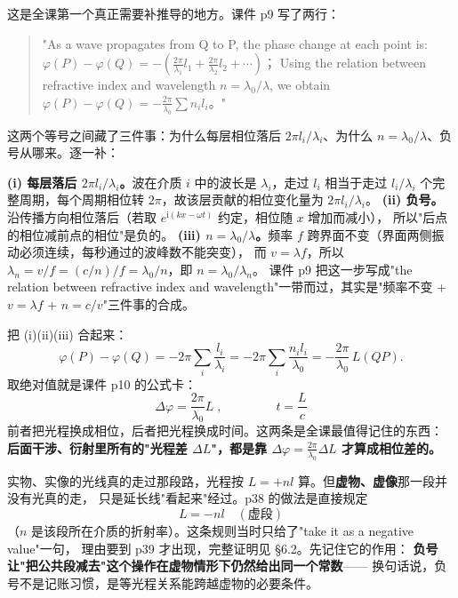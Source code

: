 \documentclass[11pt]{ctexart}
\begin{document}

这是全课第一个真正需要补推导的地方。课件 p9 写了两行：

\begin{quote}
\small\color{inkgray}
"As a wave propagates from Q to P, the phase change at each point is:
$\varphi(P)-\varphi(Q)=-\left(\frac{2\pi}{\lambda_1}l_1+\frac{2\pi}{\lambda_2}l_2+\cdots\right)$；
Using the relation between refractive index and wavelength $n=\lambda_0/\lambda$, we obtain
$\varphi(P)-\varphi(Q)=-\frac{2\pi}{\lambda_0}\sum n_il_i$。"
\end{quote}

这两个等号之间藏了三件事：为什么每层相位落后 $2\pi l_i/\lambda_i$、为什么 $n=\lambda_0/\lambda$、负号从哪来。逐一补：

\textbf{(i) 每层落后 $2\pi l_i/\lambda_i$。}波在介质 $i$ 中的波长是 $\lambda_i$，走过 $l_i$ 相当于走过
$l_i/\lambda_i$ 个完整周期，每个周期相位转 $2\pi$，故该层贡献的相位变化量为 $2\pi l_i/\lambda_i$。
\textbf{(ii) 负号。}沿传播方向相位落后（若取 $e^{\mathrm{i}(kx-\omega t)}$ 约定，相位随 $x$ 增加而减小），
所以"后点的相位减前点的相位"是负的。
\textbf{(iii) $n=\lambda_0/\lambda$。}频率 $f$ 跨界面不变（界面两侧振动必须连续，每秒通过的波峰数不能突变），
而 $v=\lambda f$，所以 $\lambda_n=v/f=(c/n)/f=\lambda_0/n$，即 $n=\lambda_0/\lambda_n$。
课件 p9 把这一步写成"the relation between refractive index and wavelength"一带而过，其实是"频率不变 + $v=\lambda f$ + $n=c/v$"三件事的合成。

把 (i)(ii)(iii) 合起来：
\[
\varphi(P)-\varphi(Q)=-2\pi\sum_i\frac{l_i}{\lambda_i}
=-2\pi\sum_i\frac{n_il_i}{\lambda_0}
=-\frac{2\pi}{\lambda_0}\,L(QP).
\]
取绝对值就是课件 p10 的公式卡：
\[
\boxed{\;\Delta\varphi=\frac{2\pi}{\lambda_0}L\;},\qquad\qquad
\boxed{\;t=\frac{L}{c}\;}
\]
前者把光程换成相位，后者把光程换成时间。这两条是全课最值得记住的东西：
\textbf{后面干涉、衍射里所有的"光程差 $\Delta L$"，都是靠 $\Delta\varphi=\frac{2\pi}{\lambda_0}\Delta L$ 才算成相位差的。}


实物、实像的光线真的走过那段路，光程按 $L=+nl$ 算。但\textbf{虚物、虚像}那一段并没有光真的走，
只是延长线"看起来"经过。p38 的做法是直接规定
\[
\boxed{\;L=-nl\quad(\text{虚段})\;}
\]
（$n$ 是该段所在介质的折射率）。这条规则当时只给了"take it as a negative value"一句，
理由要到 p39 才出现，完整证明见 §6.2。先记住它的作用：
\textbf{负号让"把公共段减去"这个操作在虚物情形下仍然给出同一个常数}——
换句话说，负号不是记账习惯，是等光程关系能跨越虚物的必要条件。
\end{document}
